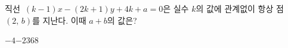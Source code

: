 직선~$(k-1)x-(2k+1)y+4k+a=0$은 실수 $k$의 값에 관계없이 항상 점~$(2,\,b)$를 지난다. 이때 $a+b$의 값은? 
\begin{choices32}{$-4$}{$-2$}{$3$}{$6$}{$8$}\end{choices32}
